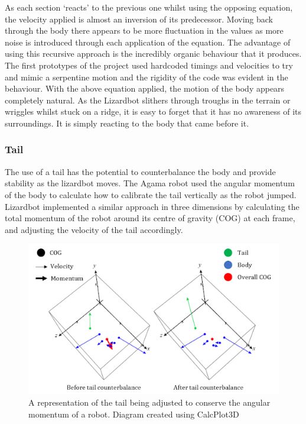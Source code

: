 \documentclass{article}
\begin{document}
As each section ‘reacts’ to the previous one whilst using the opposing equation, the velocity applied is almost an inversion of its predecessor. Moving back through the body there appears to be more fluctuation in the values as more noise is introduced through each application of the equation. The advantage of using this recursive approach is the incredibly organic behaviour that it produces. The first prototypes of the project used hardcoded timings and velocities to try and mimic a serpentine motion and the rigidity of the code was evident in the behaviour. With the above equation applied, the motion of the body appears completely natural. As the Lizardbot slithers through troughs in the terrain or wriggles whilst stuck on a ridge, it is easy to forget that it has no awareness of its surroundings. It is simply reacting to the body that came before it.


\subsubsection{Tail}
The use of a tail has the potential to counterbalance the body and provide stability as the lizardbot moves. The Agama robot used the angular momentum of the body to calculate how to calibrate the tail vertically as the robot jumped. Lizardbot implemented a similar approach in three dimensions by calculating the total momentum of the robot around its centre of gravity (COG) at each frame, and adjusting the velocity of the tail accordingly.\\ 
\begin{figure}[H]
\centering
\includegraphics[scale=0.6]{tailMomentum}
\caption{A representation of the tail being adjusted to conserve the angular momentum of a robot. Diagram created using CalcPlot3D \citep{diagrams}}
\end{figure}
\end{document}
